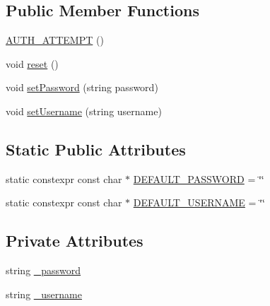 \subsection*{Public Member Functions}
\begin{DoxyCompactItemize}
\item 
\hyperlink{classAsteroids_1_1Domain_1_1Net_1_1Messages_1_1AUTH__ATTEMPT_a4c6197274eb2e952137315f9d150f30e}{A\+U\+T\+H\+\_\+\+A\+T\+T\+E\+M\+PT} ()
\item 
void \hyperlink{classAsteroids_1_1Domain_1_1Net_1_1Messages_1_1AUTH__ATTEMPT_ac3d3b7f2f68f6738cf34d34f5cc6eaf9}{reset} ()
\item 
void \hyperlink{classAsteroids_1_1Domain_1_1Net_1_1Messages_1_1AUTH__ATTEMPT_ab05c3f631e0ac62fdefe27e95b5066a2}{set\+Password} (string password)
\item 
void \hyperlink{classAsteroids_1_1Domain_1_1Net_1_1Messages_1_1AUTH__ATTEMPT_a70aded9fd40631e8b8e53b183b62b3d8}{set\+Username} (string username)
\end{DoxyCompactItemize}
\subsection*{Static Public Attributes}
\begin{DoxyCompactItemize}
\item 
static constexpr const char $\ast$ \hyperlink{classAsteroids_1_1Domain_1_1Net_1_1Messages_1_1AUTH__ATTEMPT_a24f652eeae372b731bbab0cf9f2d662e}{D\+E\+F\+A\+U\+L\+T\+\_\+\+P\+A\+S\+S\+W\+O\+RD} = \char`\"{}\char`\"{}
\item 
static constexpr const char $\ast$ \hyperlink{classAsteroids_1_1Domain_1_1Net_1_1Messages_1_1AUTH__ATTEMPT_a937ecd7f53bd238ad5169079ec938fef}{D\+E\+F\+A\+U\+L\+T\+\_\+\+U\+S\+E\+R\+N\+A\+ME} = \char`\"{}\char`\"{}
\end{DoxyCompactItemize}
\subsection*{Private Attributes}
\begin{DoxyCompactItemize}
\item 
string \hyperlink{classAsteroids_1_1Domain_1_1Net_1_1Messages_1_1AUTH__ATTEMPT_a464e5dfb574c6227822edf8cd6107504}{\+\_\+password}
\item 
string \hyperlink{classAsteroids_1_1Domain_1_1Net_1_1Messages_1_1AUTH__ATTEMPT_a3892ba17970405c8360a7bc15abd2d5f}{\+\_\+username}
\end{DoxyCompactItemize}


